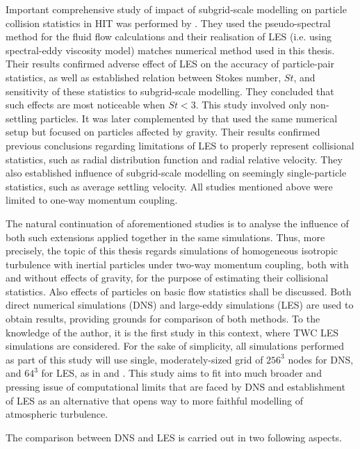 \documentclass{pracamgren}
\begin{document}
Important comprehensive study of impact of subgrid-scale modelling on particle collision statistics in HIT was performed by \textcite{Jin2010}.
They used the pseudo-spectral method for the fluid flow calculations and their realisation of LES (i.e. using spectral-eddy viscosity model) matches numerical method used in this thesis.
Their results confirmed adverse effect of LES on the accuracy of particle-pair statistics, as well as established relation between Stokes number, $St$, and sensitivity of these statistics to subgrid-scale modelling.
They concluded that such effects are most noticeable when $St < 3$.
This study involved only non-settling particles.
It was later complemented by \textcite{Rosa2017} that used the same numerical setup but focused on particles affected by gravity.
Their results confirmed previous conclusions regarding limitations of LES to properly represent collisional statistics, such as radial distribution function and radial relative velocity.
They also established influence of subgrid-scale modelling on seemingly single-particle statistics, such as average settling velocity.
All studies mentioned above were limited to one-way momentum coupling.

\smallskip

The natural continuation of aforementioned studies is to analyse the influence of both such extensions applied together in the same simulations.
Thus, more precisely, the topic of this thesis regards simulations of homogeneous isotropic turbulence with inertial particles under two-way momentum coupling, both with and without effects of gravity, for the purpose of estimating their collisional statistics.
Also effects of particles on basic flow statistics shall be discussed.
Both direct numerical simulations (DNS) and large-eddy simulations (LES) are used to obtain results, providing grounds for comparison of both methods.
To the knowledge of the author, it is the first study in this context, where TWC LES simulations are considered.
For the sake of simplicity, all simulations performed as part of this study will use single, moderately-sized grid of $256^3$ nodes for DNS, and $64^3$ for LES, as in \textcite{Jin2010} and \textcite{Rosa2017}.
This study aims to fit into much broader and pressing issue of computational limits that are faced by DNS and establishment of LES as an alternative that opens way to more faithful modelling of atmospheric turbulence.

\smallskip

The comparison between DNS and LES is carried out in two following aspects.
\end{document}
